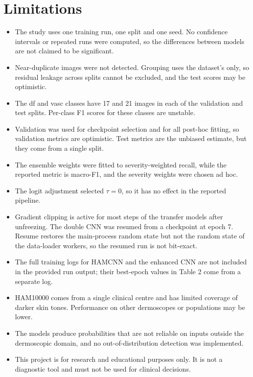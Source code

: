 \documentclass[10pt,twocolumn]{article}
\newcommand{\code}[1]{\texttt{\detokenize{#1}}}
\begin{document}
\section{Limitations}
\label{sec:limitations}

\begin{itemize}[noitemsep, leftmargin=*]
  \item The study uses one training run, one split and one seed. No confidence intervals or repeated runs were computed, so the differences between models are not claimed to be significant.
  \item Near-duplicate images were not detected. Grouping uses the dataset's \code{lesion_id} only, so residual leakage across splits cannot be excluded, and the test scores may be optimistic.
  \item The df and vasc classes have 17 and 21 images in each of the validation and test splits. Per-class F1 scores for these classes are unstable.
  \item Validation was used for checkpoint selection and for all post-hoc fitting, so validation metrics are optimistic. Test metrics are the unbiased estimate, but they come from a single split.
  \item The ensemble weights were fitted to severity-weighted recall, while the reported metric is macro-F1, and the severity weights were chosen ad hoc.
  \item The logit adjustment selected $\tau=0$, so it has no effect in the reported pipeline.
  \item Gradient clipping is active for most steps of the transfer models after unfreezing. The double CNN was resumed from a checkpoint at epoch 7. Resume restores the main-process random state but not the random state of the data-loader workers, so the resumed run is not bit-exact.
  \item The full training logs for HAMCNN and the enhanced CNN are not included in the provided run output; their best-epoch values in Table 2 come from a separate log.
  \item HAM10000 comes from a single clinical centre and has limited coverage of darker skin tones. Performance on other dermoscopes or populations may be lower.
  \item The models produce probabilities that are not reliable on inputs outside the dermoscopic domain, and no out-of-distribution detection was implemented.
  \item This project is for research and educational purposes only. It is not a diagnostic tool and must not be used for clinical decisions.
\end{itemize}
\end{document}
